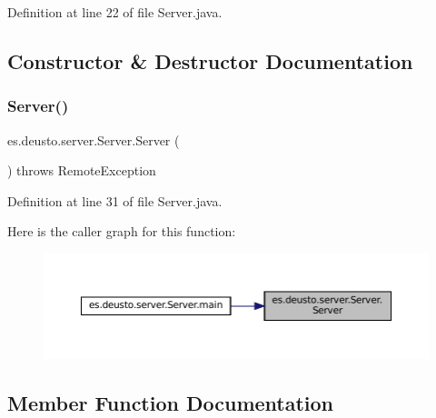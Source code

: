 Definition at line 22 of file Server.\+java.



\subsection{Constructor \& Destructor Documentation}
\mbox{\label{classes_1_1deusto_1_1server_1_1_server_a84f78162a65dd737f224eb2f94c43023}} 
\subsubsection{\texorpdfstring{Server()}{Server()}}
{\footnotesize\ttfamily es.\+deusto.\+server.\+Server.\+Server (\begin{DoxyParamCaption}{ }\end{DoxyParamCaption}) throws Remote\+Exception}



Definition at line 31 of file Server.\+java.

Here is the caller graph for this function\+:
\nopagebreak
\begin{figure}[H]
\begin{center}
\leavevmode
\includegraphics[width=350pt]{classes_1_1deusto_1_1server_1_1_server_a84f78162a65dd737f224eb2f94c43023_icgraph}
\end{center}
\end{figure}


\subsection{Member Function Documentation}
\mbox{\label{classes_1_1deusto_1_1server_1_1_server_a150317903dc393d29f39db81e79131e0}} 

